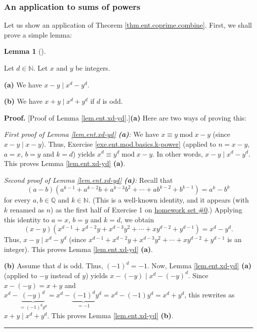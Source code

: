 \documentclass[numbers=enddot,12pt,final,onecolumn,notitlepage]{scrartcl}%
\numberwithin{exer}{subsection}
\theoremstyle{definition}
\newtheorem{lem}[theo]{Lemma}
\newenvironment{lemma}[1][]
{\begin{lem}[#1]\begin{leftbar}}
{\end{leftbar}\end{lem}}
\newenvironment{proof}[1][Proof]{\noindent\textbf{#1.} }{\ \rule{0.5em}{0.5em}}
\begin{document}
\subsubsection{An application to sums of powers}

Let us show an application of Theorem \ref{thm.ent.coprime.combine}. First, we
shall prove a simple lemma:

\begin{lemma}
\label{lem.ent.xd-yd}Let $d\in\mathbb{N}$. Let $x$ and $y$ be integers.

\textbf{(a)} We have $x-y\mid x^{d}-y^{d}$.

\textbf{(b)} We have $x+y\mid x^{d}+y^{d}$ if $d$ is odd.
\end{lemma}

\begin{proof}
[Proof of Lemma \ref{lem.ent.xd-yd}.]\textbf{(a)} Here are two ways of proving this:

\textit{First proof of Lemma \ref{lem.ent.xd-yd} \textbf{(a)}:} We have
$x\equiv y\operatorname{mod}x-y$ (since $x-y\mid x-y$). Thus, Exercise
\ref{exe.ent.mod.basics.k-power} (applied to $n=x-y$, $a=x$, $b=y$ and $k=d$)
yields $x^{d}\equiv y^{d}\operatorname{mod}x-y$. In other words, $x-y\mid
x^{d}-y^{d}$. This proves Lemma \ref{lem.ent.xd-yd} \textbf{(a)}.

\textit{Second proof of Lemma \ref{lem.ent.xd-yd} \textbf{(a)}:} Recall that%
\begin{equation}
\left(  a-b\right)  \left(  a^{k-1}+a^{k-2}b+a^{k-3}b^{2}+\cdots
+ab^{k-2}+b^{k-1}\right)  =a^{k}-b^{k} \label{pf.lem.ent.xd-yd.1}%
\end{equation}
for every $a,b\in\mathbb{Q}$ and $k\in\mathbb{N}$. (This is a well-known
identity, and it appears (with $k$ renamed as $n$) as the first half of
Exercise 1 on
\href{http://www-users.math.umn.edu/~dgrinber/19s/hw0s.pdf}{homework set
\#0}.) Applying this identity to $a=x$, $b=y$ and $k=d$, we obtain%
\[
\left(  x-y\right)  \left(  x^{d-1}+x^{d-2}y+x^{d-3}y^{2}+\cdots
+xy^{d-2}+y^{d-1}\right)  =x^{d}-y^{d}.
\]
Thus, $x-y\mid x^{d}-y^{d}$ (since $x^{d-1}+x^{d-2}y+x^{d-3}y^{2}%
+\cdots+xy^{d-2}+y^{d-1}$ is an integer). This proves Lemma
\ref{lem.ent.xd-yd} \textbf{(a)}.

\textbf{(b)} Assume that $d$ is odd. Thus, $\left(  -1\right)  ^{d}=-1$. Now,
Lemma \ref{lem.ent.xd-yd} \textbf{(a)} (applied to $-y$ instead of $y$) yields
$x-\left(  -y\right)  \mid x^{d}-\left(  -y\right)  ^{d}$. Since $x-\left(
-y\right)  =x+y$ and $x^{d}-\underbrace{\left(  -y\right)  ^{d}}_{=\left(
-1\right)  ^{d}y^{d}}=x^{d}-\underbrace{\left(  -1\right)  ^{d}}_{=-1}%
y^{d}=x^{d}-\left(  -1\right)  y^{d}=x^{d}+y^{d}$, this rewrites as $x+y\mid
x^{d}+y^{d}$. This proves Lemma \ref{lem.ent.xd-yd} \textbf{(b)}.
\end{proof}
\end{document}
